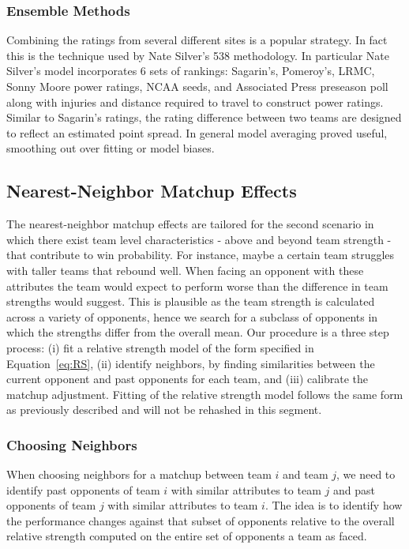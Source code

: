 \subsubsection{Ensemble Methods}
Combining the ratings from several different sites is a popular strategy. In fact this is the technique used by Nate Silver's 538 methodology. In particular Nate Silver's model incorporates 6 sets of rankings: Sagarin's, Pomeroy's, LRMC, Sonny Moore power ratings, NCAA seeds, and Associated Press preseason poll along with injuries and distance required to travel to construct power ratings.   Similar to Sagarin's ratings, the rating difference between two teams are designed to reflect an estimated point spread. In general model averaging proved useful, smoothing out over fitting or model biases.

\subsection{Nearest-Neighbor Matchup Effects}
The nearest-neighbor matchup effects are tailored for the second scenario in which there exist team level characteristics - above and beyond team strength - that contribute to win probability. For instance, maybe a certain team struggles with taller teams that rebound well. When facing an opponent with these attributes the team would expect to perform worse than the difference in team strengths would suggest. This is plausible as the team strength is calculated across a variety of opponents, hence we search for a subclass of opponents in which the strengths differ from the overall mean. Our procedure is a three step process: (i) fit a relative strength model of the form specified in Equation~\ref{eq:RS}, (ii) identify neighbors, by finding similarities between the current opponent and past opponents for each team, and (iii) calibrate the matchup adjustment. Fitting of the relative strength model follows the same form as previously described and will not be rehashed in this segment. 
\subsubsection{Choosing Neighbors}
When choosing neighbors for a matchup between team $i$ and team $j$, we need to identify past opponents of team $i$ with similar attributes to team $j$ and past opponents of team $j$ with similar attributes to team $i.$ The idea is to identify how the performance changes against that subset of opponents relative to the overall relative strength computed on the entire set of opponents a team as faced.


